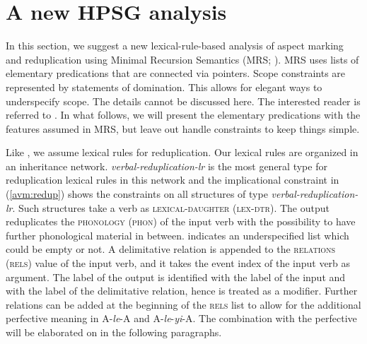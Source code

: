 \section{A new HPSG analysis}\label{sec:analysis}

In this section, we suggest a new lexical-rule-based analysis of aspect marking and reduplication
using Minimal Recursion Semantics (MRS; \citealt{Copestakeetal2005}). %
MRS uses lists of elementary predications that are connected via pointers. Scope constraints are
represented by statements of domination. This allows for elegant ways to underspecify scope. The
details cannot be discussed here. The interested reader is referred to \citet{Copestakeetal2005}. In
what follows, we will present the elementary predications with the features assumed in MRS, but leave
out handle constraints to keep things simple.

Like \citet{FanSongBond2015}, we assume lexical rules for reduplication. Our lexical rules are
organized in an inheritance network. \textit{verbal-reduplication-lr} is the most general type for
reduplication lexical rules in this network and the implicational constraint in (\ref{avm:redup}) shows the constraints on all
structures of type \textit{verbal-reduplication-lr}. Such structures take a verb as
\textsc{lexical-daughter (lex-dtr)}.  The output reduplicates the \textsc{phonology (phon)} of the
input verb with the possibility to have further phonological material in between.  \etag{} indicates
an underspecified list which could be empty or not.  A delimitative relation is appended to the
\textsc{relations (rels)} value of the input verb, and it takes the event index of the input verb as
argument.  The label of the output  is identified with the label of the input and with the
label of the delimitative relation, hence  is treated as a modifier.  Further
relations can be added at the beginning of the \textsc{rels} list to allow for the additional
perfective meaning in A-\textit{le}-A and A-\textit{le}-\textit{yi}-A.  The combination with the
perfective will be elaborated on in the following paragraphs.

\eas
{} \impl\\
\label{avm:redup}
\zs


